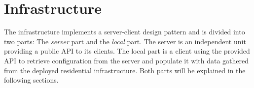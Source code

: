 
\chapter{Infrastructure}
\label{sec:infrastructure}

The infrastructure implements a server-client design pattern and is divided into two parts:
The \emph{server} part and the \emph{local} part.
The server is an independent unit providing a public API to its clients.
The local part is a client using the provided API to retrieve configuration from the server and populate it with data gathered from the deployed residential infrastructure.
Both parts will be explained in the following sections.
